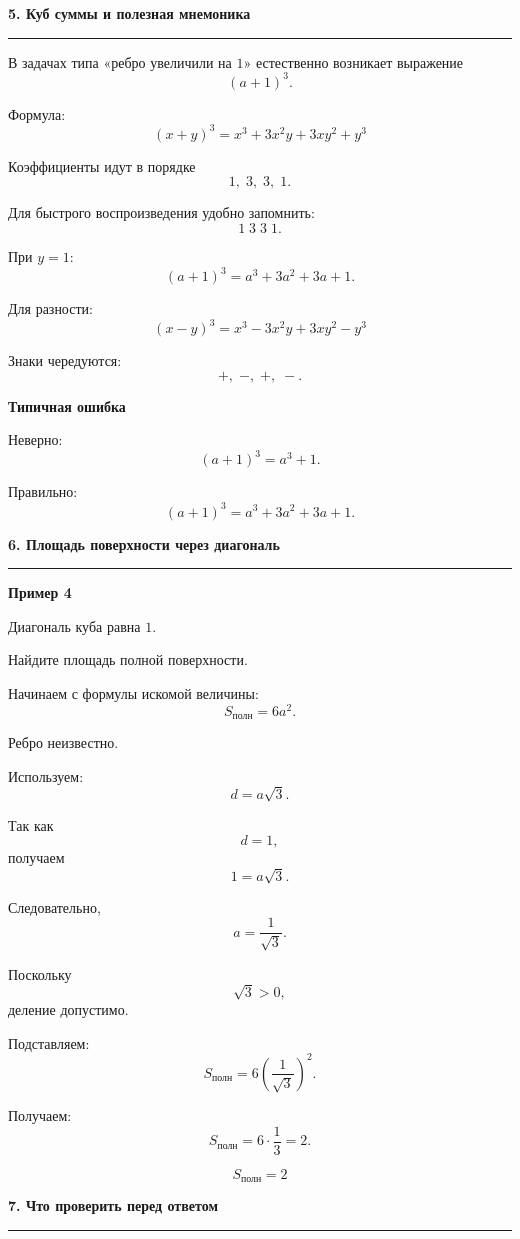 \documentclass[a4paper,12pt]{article}
\newcommand{\sectiontitle}[1]{%
    \vspace{0.6em}
    {\Large\bfseries\color{darkaccent}#1}\par
    \vspace{0.25em}
    {\color{accent}\rule{\linewidth}{0.7pt}}
    \vspace{0.45em}
}
\newcommand{\subsectiontitle}[1]{%
    \vspace{0.4em}
    {\large\bfseries\color{darkaccent}#1}\par
    \vspace{0.2em}
}
\begin{document}
\clearpage

\sectiontitle{5. Куб суммы и полезная мнемоника}

В задачах типа «ребро увеличили на \(1\)» естественно возникает выражение
\[
(a+1)^3.
\]

Формула:
\[
\boxed{
(x+y)^3
=
x^3+3x^2y+3xy^2+y^3
}
\]

Коэффициенты идут в порядке
\[
1,\;3,\;3,\;1.
\]

Для быстрого воспроизведения удобно запомнить:
\[
\boxed{1\;3\;3\;1}.
\]

При \(y=1\):
\[
(a+1)^3
=
a^3+3a^2+3a+1.
\]

Для разности:
\[
\boxed{
(x-y)^3
=
x^3-3x^2y+3xy^2-y^3
}
\]

Знаки чередуются:
\[
+,\;-,\;+,\;-.
\]

\subsectiontitle{Типичная ошибка}

Неверно:
\[
(a+1)^3=a^3+1.
\]

Правильно:
\[
(a+1)^3
=
a^3+3a^2+3a+1.
\]

\sectiontitle{6. Площадь поверхности через диагональ}

\subsectiontitle{Пример 4}

Диагональ куба равна \(1\).

Найдите площадь полной поверхности.

Начинаем с формулы искомой величины:
\[
S_{\text{полн}}=6a^2.
\]

Ребро неизвестно.

Используем:
\[
d=a\sqrt3.
\]

Так как
\[
d=1,
\]
получаем
\[
1=a\sqrt3.
\]

Следовательно,
\[
a=\frac{1}{\sqrt3}.
\]

Поскольку
\[
\sqrt3>0,
\]
деление допустимо.

Подставляем:
\[
S_{\text{полн}}
=
6\left(\frac{1}{\sqrt3}\right)^2.
\]

Получаем:
\[
S_{\text{полн}}
=
6\cdot\frac13
=
2.
\]

\[
\boxed{S_{\text{полн}}=2}
\]

\sectiontitle{7. Что проверить перед ответом}
\end{document}
